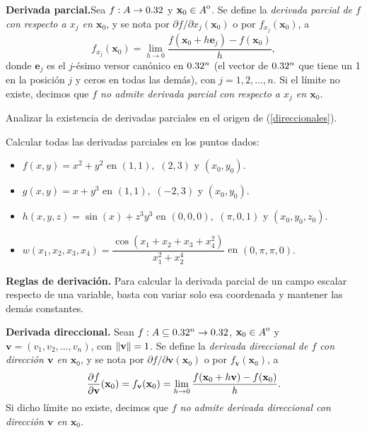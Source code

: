 \label{sec:derivabilidad}

\begin{definition}
    \textbf{Derivada parcial.}Sea $f:A\to 0.32$ y $\mathbf{x}_0\in {\kern0ptA}^{\mathrm{o}}$. Se define la \emph{derivada parcial de $f$ con respecto a $x_j$ en $\mathbf{x}_0$}, y se nota por $\partial f/\partial x_j(\mathbf{x}_0)$ o por $f_{x_j}(\mathbf{x}_0)$, a
    \[
        f_{x_j}(\mathbf{x}_0)=\lim_{h\to0}\dfrac{f(\mathbf{x}_0+h\mathbf{e}_j)-f(\mathbf{x}_0)}{h},
    \]
    donde $\mathbf{e}_j$ es el $j$-\'esimo versor can\'onico en $0.32^n$ (el vector de $0.32^n$ que tiene un 1 en la posición $j$ y ceros en todas las demás), con $j=1,2,\dots,n$. Si el l\'imite no existe, decimos que \emph{$f$ no admite derivada parcial con respecto a $x_j$ en $\mathbf{x}_0$}.
\end{definition}

\begin{tarea}  Analizar la existencia de derivadas  parciales  en el origen de (\ref{direccionales}).  
\end{tarea}

\begin{tarea}\label{tarea_deeriv_parc} Calcular todas las derivadas parciales en los puntos dados:
\begin{itemize}
\item[1.] $f(x,y)= x^{2}+y^{2}$   \: \: en $(1,1),$  $(2,3)$ y  $(x_0, y_0).$
\item[2.] $g(x,y)= x+y^{3}$   \: \: en $(1,1),$  $(-2,3)$ y  $(x_0, y_0).$
\item[3.] $h(x,y,z)=  \sin(x)+z^{3}y^{3}$   \: \: en $(0,0,0),$  $(\pi, 0,1 )$ y  $(x_0, y_0,z_0).$
\item[4.] $w(x_1,x_2,x_3,x_4) = \dfrac{\cos(x_1+x_2+x_3+x^{2}_4)}{x_1^{2}+ x_2^{4}}$  \: \: en $(0,\pi,\pi, 0).$
\end{itemize}
\end{tarea}

\begin{obs} \textbf{Reglas de derivaci\'on.} Para calcular la derivada parcial de un campo escalar respecto de una variable,  basta con variar solo esa coordenada y mantener las demás constantes. 
\end{obs}

\begin{definition}
    \textbf{Derivada direccional.} Sean $f:A\subseteq0.32^n\to0.32$, $\mathbf{x}_0\in {\kern0ptA}^{\mathrm{o}}$ y $\mathbf{v}=(v_1, v_2, \dots, v_n)$, con $\norm{\mathbf{v}}=1$. Se define la \emph{derivada direccional de $f$ con direcci\'on $\mathbf{v}$ en $\mathbf{x}_0$}, y se nota por $\partial f/\partial \mathbf{v}(\mathbf{x}_0)$ o por $f_{\mathbf{v}}(\mathbf{x}_0)$, a
    \[
        \dfrac{\partial f}{\partial \mathbf{v}}(\mathbf{x}_0)=f_{\mathbf{v}}(\mathbf{x}_0)=\lim_{h\to0}\frac{f(\mathbf{x}_0+h\mathbf{v})-f(\mathbf{x}_0)}{h}.
    \]
    Si dicho l\'imite no existe, decimos que \emph{$f$ no admite derivada direccional con direcci\'on $\mathbf{v}$ en $\mathbf{x}_0$}.
\end{definition}

